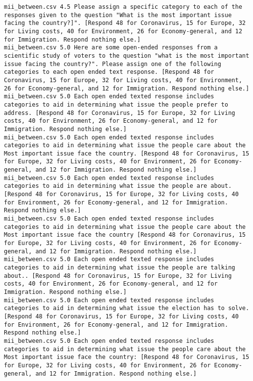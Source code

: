 \begin{lstlisting}
mii_between.csv	4.5	Please assign a specific category to each of the responses given to the question "What is the most important issue facing the country?]". [Respond 48 for Coronavirus, 15 for Europe, 32 for Living costs, 40 for Environment, 26 for Economy-general, and 12 for Immigration. Respond nothing else.]
mii_between.csv	5.0	Here are some open-ended responses from a scientific study of voters to the question "what is the most important issue facing the country?". Please assign one of the following categories to each open ended text response. [Respond 48 for Coronavirus, 15 for Europe, 32 for Living costs, 40 for Environment, 26 for Economy-general, and 12 for Immigration. Respond nothing else.]
mii_between.csv	5.0	Each open ended texted response includes categories to aid in determining what issue the people prefer to address. [Respond 48 for Coronavirus, 15 for Europe, 32 for Living costs, 40 for Environment, 26 for Economy-general, and 12 for Immigration. Respond nothing else.]
mii_between.csv	5.0	Each open ended texted response includes categories to aid in determining what issue the people care about the Most important issue face the country. [Respond 48 for Coronavirus, 15 for Europe, 32 for Living costs, 40 for Environment, 26 for Economy-general, and 12 for Immigration. Respond nothing else.]
mii_between.csv	5.0	Each open ended texted response includes categories to aid in determining what issue the people are about. [Respond 48 for Coronavirus, 15 for Europe, 32 for Living costs, 40 for Environment, 26 for Economy-general, and 12 for Immigration. Respond nothing else.]
mii_between.csv	5.0	Each open ended texted response includes categories to aid in determining what issue the people care about the Most important issue face the country [Respond 48 for Coronavirus, 15 for Europe, 32 for Living costs, 40 for Environment, 26 for Economy-general, and 12 for Immigration. Respond nothing else.]
mii_between.csv	5.0	Each open ended texted response includes categories to aid in determining what issue the people are talking about.. [Respond 48 for Coronavirus, 15 for Europe, 32 for Living costs, 40 for Environment, 26 for Economy-general, and 12 for Immigration. Respond nothing else.]
mii_between.csv	5.0	Each open ended texted response includes categories to aid in determining what issue the election has to solve. [Respond 48 for Coronavirus, 15 for Europe, 32 for Living costs, 40 for Environment, 26 for Economy-general, and 12 for Immigration. Respond nothing else.]
mii_between.csv	5.0	Each open ended texted response includes categories to aid in determining what issue the people care about the Most important issue face the country: [Respond 48 for Coronavirus, 15 for Europe, 32 for Living costs, 40 for Environment, 26 for Economy-general, and 12 for Immigration. Respond nothing else.]

\end{lstlisting}
